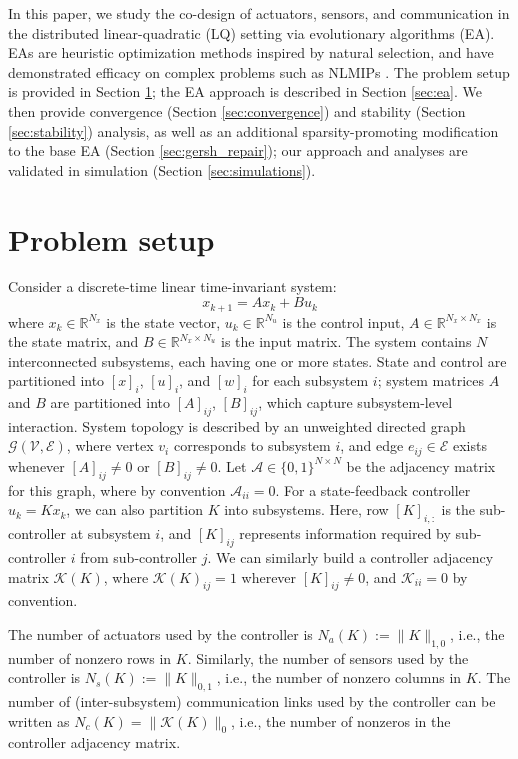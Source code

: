 \documentclass[letterpaper, 10pt, conference]{ieeeconf}
\begin{document}
In this paper, we study the co-design of actuators, sensors, and communication in the distributed linear-quadratic (LQ) setting via evolutionary algorithms (EA). EAs are heuristic optimization methods inspired by natural selection, and have demonstrated efficacy on complex problems such as NLMIPs \cite{Whitley2001, DeJong2014}. The problem setup is provided in Section \ref{sec:problem_setup}; the EA approach is described in Section \ref{sec:ea}. We then provide convergence (Section \ref{sec:convergence}) and stability (Section \ref{sec:stability}) analysis, as well as an additional sparsity-promoting modification to the base EA (Section \ref{sec:gersh_repair}); our approach and analyses are validated in simulation (Section \ref{sec:simulations}).

\section{Problem setup} \label{sec:problem_setup}

Consider a discrete-time linear time-invariant system:
\begin{equation} \label{eq:plant}
x_{k+1} = A x_k + B u_k
\end{equation}
where $x_k \in \mathbb{R}^{N_x}$ is the state vector, $u_k \in \mathbb{R}^{N_u}$ is the control input, $A \in \mathbb{R}^{N_x \times N_x}$ is the state matrix, and $B \in \mathbb{R}^{N_x \times N_u}$ is the input matrix. The system contains $N$ interconnected subsystems, each having one or more states. State and control are partitioned into $[x]_i$, $[u]_i$, and $[w]_i$ for each subsystem $i$; system matrices $A$ and $B$ are partitioned into $[A]_{ij}$, $[B]_{ij}$, which capture subsystem-level interaction. System topology is described by an unweighted directed graph $\mathcal{G}(\mathcal{V}, \mathcal{E})$, where vertex $v_i$ corresponds to subsystem $i$, and edge $e_{ij} \in \mathcal{E}$ exists whenever $[A]_{ij} \neq 0$ or $[B]_{ij} \neq 0$. Let $\mathcal{A}\in \{0,1\}^{N \times N}$ be the adjacency matrix for this graph, where by convention $\mathcal{A}_{ii} = 0$. For a state-feedback controller $u_k = Kx_k$, we can also partition $K$ into subsystems. Here, row $[K]_{i,:}$ is the sub-controller at subsystem $i$, and $[K]_{ij}$ represents information required by sub-controller $i$ from sub-controller $j$. We can similarly build a controller adjacency matrix $\mathcal{K}(K)$, where $\mathcal{K}(K)_{ij} = 1$ wherever $[K]_{ij} \neq 0$, and $\mathcal{K}_{ii} = 0$ by convention. 

The number of actuators used by the controller is $N_a(K) := \|K\|_{1,0}$, i.e., the number of nonzero rows in $K$. Similarly, the number of sensors used by the controller is $N_s(K) := \|K\|_{0,1}$, i.e., the number of nonzero columns in $K$. The number of (inter-subsystem) communication links used by the controller can be written as $N_c(K) = \|\mathcal{K}(K)\|_0$, i.e., the number of nonzeros in the controller adjacency matrix.
\end{document}
